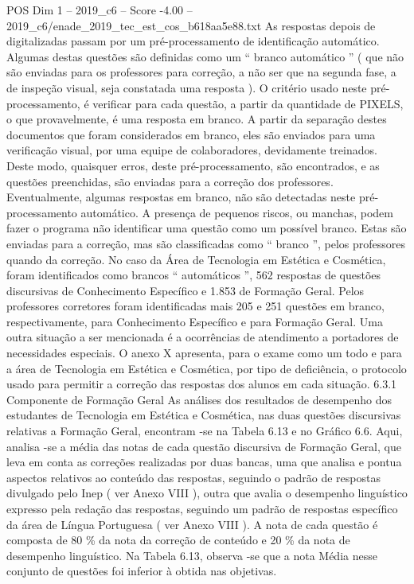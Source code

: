 \begin{textsample}{POS Dim 1 – 2019\_c6 – Score -4.00 – 2019\_c6/enade\_2019\_tec\_est\_cos\_b618aa5e88.txt}
As respostas depois de digitalizadas passam por um pré-processamento de identificação automático.
Algumas destas questões são definidas como um “ branco automático ” ( que não são enviadas para os professores para correção, a não ser que na segunda fase, a de inspeção visual, seja constatada uma resposta ).
O critério usado neste pré-processamento, é verificar para cada questão, a partir da quantidade de PIXELS, o que provavelmente, é uma resposta em branco.
A partir da separação destes documentos que foram considerados em branco, eles são enviados para uma verificação visual, por uma equipe de colaboradores, devidamente treinados.
Deste modo, quaisquer erros, deste pré-processamento, são encontrados, e as questões preenchidas, são enviadas para a correção dos professores.
Eventualmente, algumas respostas em branco, não são detectadas neste pré-processamento automático.
A presença de pequenos riscos, ou manchas, podem fazer o programa não identificar uma questão como um possível branco.
Estas são enviadas para a correção, mas são classificadas como “ branco ”, pelos professores quando da correção.
No caso da Área de Tecnologia em Estética e Cosmética, foram identificados como brancos “ automáticos ”, 562 respostas de questões discursivas de Conhecimento Específico e 1.853 de Formação Geral.
Pelos professores corretores foram identificadas mais 205 e 251 questões em branco, respectivamente, para Conhecimento Específico e para Formação Geral.
Uma outra situação a ser mencionada é a ocorrências de atendimento a portadores de necessidades especiais.
O anexo X apresenta, para o exame como um todo e para a área de Tecnologia em Estética e Cosmética, por tipo de deficiência, o protocolo usado para permitir a correção das respostas dos alunos em cada situação. 6.3.1 Componente de Formação Geral As análises dos resultados de desempenho dos estudantes de Tecnologia em Estética e Cosmética, nas duas questões discursivas relativas a Formação Geral, encontram -se na Tabela 6.13 e no Gráfico 6.6.
Aqui, analisa -se a média das notas de cada questão discursiva de Formação Geral, que leva em conta as correções realizadas por duas bancas, uma que analisa e pontua aspectos relativos ao conteúdo das respostas, seguindo o padrão de respostas divulgado pelo Inep ( ver Anexo VIII ), outra que avalia o desempenho linguístico expresso pela redação das respostas, seguindo um padrão de respostas específico da área de Língua Portuguesa ( ver Anexo VIII ).
A nota de cada questão é composta de 80 \% da nota da correção de conteúdo e 20 \% da nota de desempenho linguístico.
Na Tabela 6.13, observa -se que a nota Média nesse conjunto de questões foi inferior à obtida nas objetivas.

\end{textsample}
